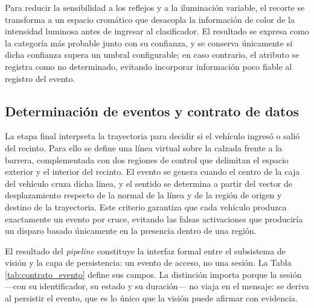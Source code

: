 Para reducir la sensibilidad a los reflejos y a la iluminación variable, el
recorte se transforma a un espacio cromático que desacopla la información de
color de la intensidad luminosa antes de ingresar al clasificador. El resultado
se expresa como la categoría más probable junto con su confianza, y se conserva
únicamente si dicha confianza supera un umbral configurable; en caso contrario,
el atributo se registra como no determinado, evitando incorporar información
poco fiable al registro del evento.

\subsection{Determinación de eventos y contrato de datos}

La etapa final interpreta la trayectoria para decidir si el vehículo ingresó o
salió del recinto. Para ello se define una línea virtual sobre la calzada frente
a la barrera, complementada con dos regiones de control que delimitan el espacio
exterior y el interior del recinto. El evento se genera cuando el centro de la
caja del vehículo cruza dicha línea, y el sentido se determina a partir del
vector de desplazamiento respecto de la normal de la línea y de la región de
origen y destino de la trayectoria. Este criterio garantiza que cada vehículo
produzca exactamente un evento por cruce, evitando las falsas activaciones que
produciría un disparo basado únicamente en la presencia dentro de una región.

El resultado del \textit{pipeline} constituye la interfaz formal entre el
subsistema de visión y la capa de persistencia: un evento de acceso, no una
sesión. La Tabla \ref{tab:contrato_evento} define sus campos. La distinción
importa porque la sesión ---con su identificador, su estado y su duración--- no
viaja en el mensaje: se deriva al persistir el evento, que es lo único que la
visión puede afirmar con evidencia.

